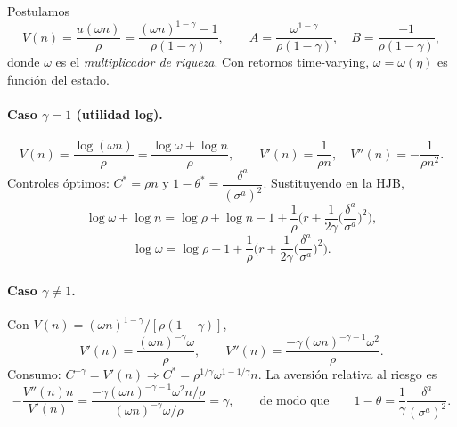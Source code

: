 \documentclass[11pt]{article}
\theoremstyle{definition}
\theoremstyle{remark}
\begin{document}
Postulamos
\begin{equation}\label{eq:guess}
V(n)=\frac{u(\omega n)}{\rho}=\frac{(\omega n)^{1-\gamma}-1}{\rho(1-\gamma)},
\qquad
A=\frac{\omega^{1-\gamma}}{\rho(1-\gamma)},\quad B=\frac{-1}{\rho(1-\gamma)},
\end{equation}
donde $\omega$ es el \emph{multiplicador de riqueza}. Con retornos time-varying, $\omega=\omega(\eta)$ es función del estado.

\paragraph{Caso $\gamma=1$ (utilidad log).}
\[
V(n)=\frac{\log(\omega n)}{\rho}=\frac{\log\omega+\log n}{\rho},
\qquad V'(n)=\frac{1}{\rho n},\quad V''(n)=-\frac{1}{\rho n^2}.
\]
Controles óptimos: $C^*=\rho n$ y $1-\theta^*=\dfrac{\delta^{a}}{(\sigma^{a})^2}$. Sustituyendo en la HJB,
\[
\log\omega+\log n=\log\rho+\log n-1+\frac{1}{\rho}\Big(r+\frac{1}{2\gamma}\Big(\frac{\delta^{a}}{\sigma^{a}}\Big)^2\Big),
\]
\begin{equation}
\boxed{\ \log\omega=\log\rho-1+\frac{1}{\rho}\Big(r+\frac{1}{2\gamma}\Big(\frac{\delta^{a}}{\sigma^{a}}\Big)^2\Big).\ }
\end{equation}

\paragraph{Caso $\gamma\neq1$.}
Con $V(n)=(\omega n)^{1-\gamma}/[\rho(1-\gamma)]$,
\[
V'(n)=\frac{(\omega n)^{-\gamma}\omega}{\rho},\qquad
V''(n)=\frac{-\gamma(\omega n)^{-\gamma-1}\omega^2}{\rho}.
\]
Consumo: $C^{-\gamma}=V'(n)\Rightarrow C^{*}=\rho^{1/\gamma}\omega^{1-1/\gamma}n$. La aversión relativa al riesgo es
\[
-\frac{V''(n)n}{V'(n)}=\frac{-\gamma(\omega n)^{-\gamma-1}\omega^2 n/\rho}{(\omega n)^{-\gamma}\omega/\rho}=\gamma,
\qquad\text{de modo que}\qquad
1-\theta=\frac{1}{\gamma}\frac{\delta^{a}}{(\sigma^{a})^2}.
\]
\end{document}
